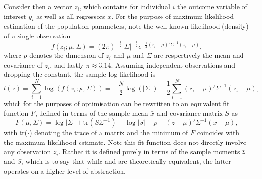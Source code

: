 Consider then a vector $z_i$, which contains for individual $i$ the outcome variable of interest $y_i$ as well as
all regressors $x$.
For the purpose of maximum likelihood estimation of the population parameters, note the well-known
likelihood (density) of a single observation
\begin{equation}
    f(z_i; \mu, \Sigma) = (2\pi)^{-\frac{p}{2}} |\Sigma|^{-\frac{1}{2}} e^{-\frac{1}{2}(z_i - \mu)' \Sigma^{-1}(z_i - \mu)},
\end{equation}
where $p$ denotes the dimension of $z_i$ and $\mu$ and $\Sigma$ are respectively the mean and covariance of $z_i$,
and lastly $\pi \approx 3.14$.
Assuming independent observations and dropping the constant, the sample log likelihood is
\begin{equation}
    \label{eq:methods:sample_likelihood}
    l(z) = \sum_{i=1}^N \log(f(z_i; \mu, \Sigma))
    = -\frac{N}{2} \log(|\Sigma|) -\frac{1}{2} \sum_{i=1}^N (z_i - \mu)' \Sigma^{-1} (z_i - \mu),
\end{equation}
which for the purposes of optimisation can be rewritten to an equivalent fit function $F$, defined in terms of
the sample mean $\bar{x}$ and covariance matrix $S$ \cite{preacher2016ml} as
\begin{equation}
    \label{eq:methods:objective_function}
    F(\mu, \Sigma) = \log|\Sigma| + \text{tr}(S \Sigma^{-1}) - \log|S| - p + (\bar{z} - \mu)' \Sigma^{-1} (\bar{x} - \mu),
\end{equation}
with tr($\cdot$) denoting the trace of a matrix and the minimum of $F$ coincides with the maximum likelihood estimate.
Note this fit function does not directly involve any observation $z_i$. Rather it is defined purely in terms of the
sample moments $\bar{z}$ and $S$, which is to say that while  and
 are theoretically equivalent, the latter operates on a higher level of abstraction.

